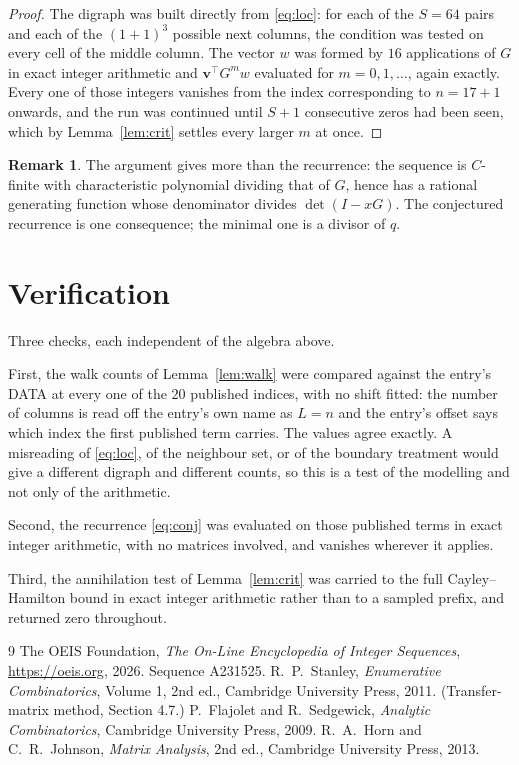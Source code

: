 \documentclass[11pt,a4paper]{article}
\theoremstyle{plain}
\theoremstyle{definition}
\newtheorem{remark}[theorem]{Remark}
\begin{document}
\begin{proof}
The digraph was built directly from \eqref{eq:loc}: for each of the $S=64$ pairs and each
of the $(1+1)^{3}$ possible next columns, the condition was tested on every cell of
the middle column. The vector $w$ was formed by $16$ applications of $G$ in exact integer
arithmetic and $\mathbf{v}^{\!\top}G^{m}w$ evaluated for $m=0,1,\dots$, again exactly.
Every one of those integers vanishes from the index corresponding to $n=17+1$ onwards,
and the run was continued until $S+1$ consecutive zeros had been seen, which by
Lemma~\ref{lem:crit} settles every larger $m$ at once.
\end{proof}

\begin{remark}
The argument gives more than the recurrence: the sequence is $C$-finite with characteristic
polynomial dividing that of $G$, hence has a rational generating function whose denominator
divides $\det(I-xG)$. The conjectured recurrence is one consequence; the minimal one is a
divisor of $q$.
\end{remark}

\section{Verification}

Three checks, each independent of the algebra above.

First, the walk counts of Lemma~\ref{lem:walk} were compared against the entry's DATA at
every one of the $20$ published indices, with no shift fitted: the number of columns is
read off the entry's own name as $L=n$ and the entry's offset says which index the first
published term carries. The values agree exactly. A misreading of \eqref{eq:loc}, of the
neighbour set, or of the boundary treatment would give a different digraph and different
counts, so this is a test of the modelling and not only of the arithmetic.

Second, the recurrence \eqref{eq:conj} was evaluated on those published terms in exact
integer arithmetic, with no matrices involved, and vanishes wherever it applies.

Third, the annihilation test of Lemma~\ref{lem:crit} was carried to the full
Cayley--Hamilton bound in exact integer arithmetic rather than to a sampled prefix, and
returned zero throughout.

\begin{thebibliography}{9}
 The OEIS Foundation, \emph{The On-Line Encyclopedia of Integer
Sequences}, \url{https://oeis.org}, 2026. Sequence A231525.
 R.~P.~Stanley, \emph{Enumerative Combinatorics}, Volume 1, 2nd ed.,
Cambridge University Press, 2011. (Transfer-matrix method, Section 4.7.)
 P.~Flajolet and R.~Sedgewick, \emph{Analytic Combinatorics}, Cambridge
University Press, 2009.
 R.~A.~Horn and C.~R.~Johnson, \emph{Matrix Analysis}, 2nd ed., Cambridge
University Press, 2013.
\end{thebibliography}
\end{document}
